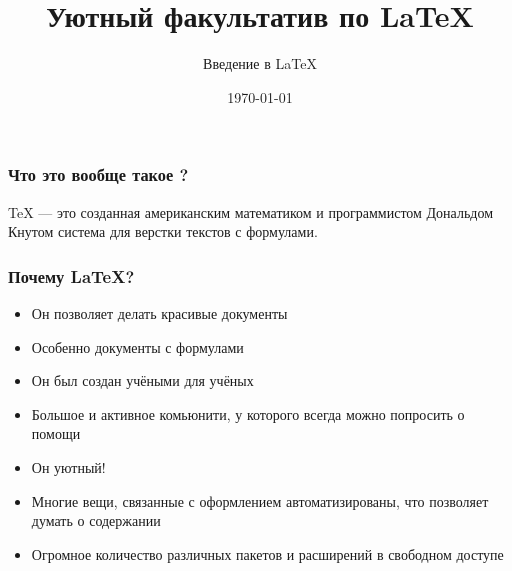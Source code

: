 \documentclass[newPxFont]{beamer}
\title{Уютный факультатив по \LaTeX}
\subtitle{Введение в \LaTeX}
\date{\today}
\begin{document}
 \maketitle
 
 
\begin{frame}
\frametitle{Что это вообще такое ?} 

\alert{TeX} --- это созданная американским математиком и программистом Дональдом Кнутом система для верстки текстов с формулами. 


\end{frame} 

\begin{frame}
\frametitle{Почему \LaTeX{}?} 
\begin{itemize}
\item Он позволяет делать красивые документы
\item Особенно документы с формулами
\item Он был создан учёными для учёных
\item Большое и активное комьюнити, у которого всегда можно попросить о помощи
\item Он уютный!
\item Многие вещи, связанные с оформлением автоматизированы, что позволяет думать о содержании
\item Огромное количество различных пакетов и расширений в свободном доступе
\end{itemize}
\end{frame}
\end{document}
